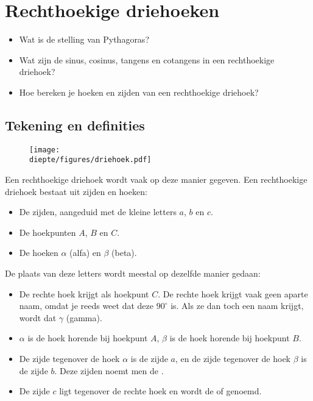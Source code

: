 \documentclass[a4paper,12pt]{article}
\newcommand{\diepte}{./}
\begin{document}
\newpage

\section{Rechthoekige driehoeken}

\begin{itemize}
	\item Wat is de stelling van Pythagoras?
	\item Wat zijn de sinus, cosinus, tangens en cotangens in een rechthoekige driehoek?
	\item Hoe bereken je hoeken en zijden van een rechthoekige driehoek?
\end{itemize}

\subsection{Tekening en definities}

\begin{figure}[h]
\begin{center}
\texttt{[image: \\diepte/figures/driehoek.pdf]}
\end{center}
\end{figure}

Een rechthoekige driehoek wordt vaak op deze manier gegeven. Een rechthoekige driehoek bestaat uit zijden en hoeken:
\begin{itemize}
	\item De zijden, aangeduid met de kleine letters $a$, $b$ en $c$.
	\item De hoekpunten $A$, $B$ en $C$.
	\item De hoeken $\alpha$ (alfa) en $\beta$ (beta).
\end{itemize}

De plaats van deze letters wordt meestal op dezelfde manier gedaan:
\begin{itemize}
	\item De rechte hoek krijgt als hoekpunt $C$. De rechte hoek krijgt vaak geen aparte naam, omdat je reeds weet dat deze $90^\circ$ is. Als ze dan toch een naam krijgt, wordt dat $\gamma$ (gamma).
	\item $\alpha$ is de hoek horende bij hoekpunt $A$, $\beta$ is de hoek horende bij hoekpunt $B$.
	\item De zijde tegenover de hoek $\alpha$ is de zijde $a$, en de zijde tegenover de hoek $\beta$ is de zijde $b$. Deze zijden noemt men de .
	\item De zijde $c$ ligt tegenover de rechte hoek en wordt de  of  genoemd.
\end{itemize}
\end{document}
